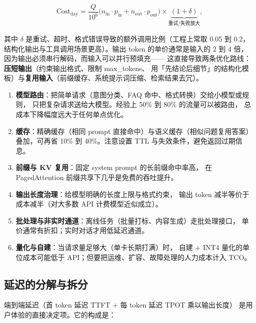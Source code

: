 \begin{equation}
\text{Cost}_{\text{day}} = \frac{Q}{10^6}
\Big( n_{\text{in}} \cdot p_{\text{in}} + n_{\text{out}} \cdot p_{\text{out}} \Big)
\times \underbrace{(1 + \delta)}_{\text{重试/失败放大}} ,
\label{eq:cost-formula}
\end{equation}

其中 $\delta$ 是重试、超时、格式错误导致的额外调用比例（工程上常取 0.05 到 0.2，
结构化输出与工具调用场景更高）。输出 token 的单价通常是输入的 2 到 4 倍，
因为输出必须串行解码，而输入可以并行预填充——
这直接导致两条优化路线：\textbf{压短输出}（约束输出格式、限制 max\_tokens、
用「先结论后细节」的结构化模板）与\textbf{复用输入}（前缀缓存、系统提示词压缩、检索结果去冗）。

\begin{toolbox}
\begin{enumerate}
  \item \textbf{模型路由}：把简单请求（意图分类、FAQ 命中、格式转换）交给小模型或规则，
        只把复杂请求送给大模型。经验上 50\% 到 80\% 的流量可以被路由，
        总成本下降幅度远大于任何单点优化。
  \item \textbf{缓存}：精确缓存（相同 prompt 直接命中）与语义缓存（相似问题复用答案）
        叠加，可再省 10\% 到 40\%。注意设置 TTL 与失效条件，避免返回过期信息。
  \item \textbf{前缀与 KV 复用}：固定 system prompt 的长前缀命中率高，
        在 PagedAttention 前缀共享下几乎是免费的吞吐提升。
  \item \textbf{输出长度治理}：给模型明确的长度上限与格式约束，
        输出 token 减半等价于成本减半（对大多数 API 计费模型近似成立）。
  \item \textbf{批处理与非实时通道}：离线任务（批量打标、内容生成）走批处理接口，
        单价通常有折扣；实时对话才用低延迟通道。
  \item \textbf{量化与自建}：当请求量足够大（单卡长期打满）时，
        自建 + INT4 量化的单位成本可能低于 API；但要把运维、扩容、故障处理的人力成本计入 TCO。
\end{enumerate}
\end{toolbox}

\subsection{延迟的分解与拆分}

端到端延迟（首 token 延迟 TTFT + 每 token 延迟 TPOT 乘以输出长度）
是用户体验的直接决定项。它的构成是：

